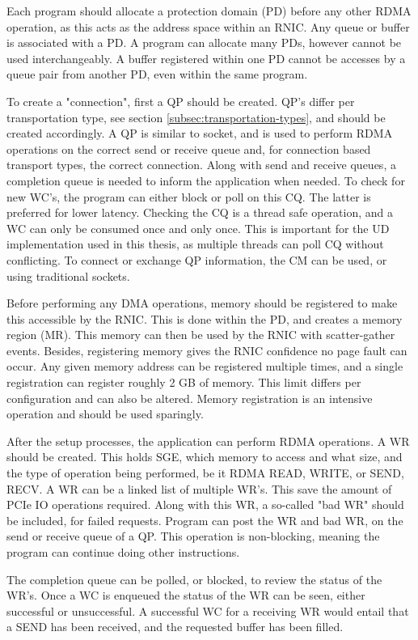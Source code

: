 Each program should allocate a protection domain (PD) before any other RDMA operation, as this acts as the address space within an RNIC.
Any queue or buffer is associated with a PD.
A program can allocate many PDs, however cannot be used interchangeably.
A buffer registered within one PD cannot be accesses by a queue pair from another PD, even within the same program.

To create a "connection", first a QP should be created.
QP's differ per transportation type, see section \ref{subsec:transportation-types}, and should be created accordingly.
A QP is similar to socket, and is used to perform RDMA operations on the correct send or receive queue and, for connection based transport types, the correct connection.
Along with send and receive queues, a completion queue is needed to inform the application when needed.
To check for new WC's, the program can either block or poll on this CQ.
The latter is preferred for lower latency.
Checking the CQ is a thread safe operation, and a WC can only be consumed once and only once.
This is important for the UD implementation used in this thesis, as multiple threads can poll CQ without conflicting.
To connect or exchange QP information, the CM can be used, or using traditional sockets.

Before performing any DMA operations, memory should be registered to make this accessible by the RNIC.
This is done within the PD, and creates a memory region (MR).
This memory can then be used by the RNIC with scatter-gather events.
Besides, registering memory gives the RNIC confidence no page fault can occur.
Any given memory address can be registered multiple times, and a single registration can register roughly 2 GB of memory.
This limit differs per configuration and can also be altered.
Memory registration is an intensive operation and should be used sparingly.

After the setup processes, the application can perform RDMA operations.
A WR should be created.
This holds SGE, which memory to access and what size, and the type of operation being performed, be it RDMA READ, WRITE, or SEND, RECV.
A WR can be a linked list of multiple WR's.
This save the amount of PCIe IO operations required.
Along with this WR, a so-called "bad WR" should be included, for failed requests.
Program can post the WR and bad WR, on the send or receive queue of a QP.
This operation is non-blocking, meaning the program can continue doing other instructions.

The completion queue can be polled, or blocked, to review the status of the WR's.
Once a WC is enqueued the status of the WR can be seen, either successful or unsuccessful.
A successful WC for a receiving WR would entail that a SEND has been received, and the requested buffer has been filled.








